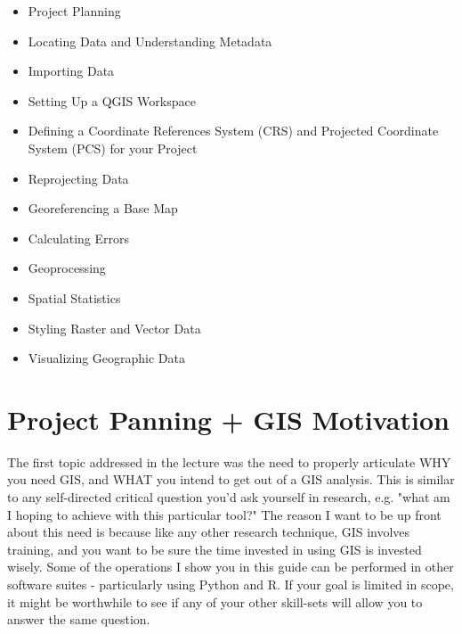 \documentclass{article}
\begin{document}
\begin{itemize}
  \item Project Planning
  \item Locating Data and Understanding Metadata
  \item Importing Data
  \item Setting Up a QGIS Workspace
  \item Defining a Coordinate References System (CRS) and Projected Coordinate System (PCS) for your Project
  \item Reprojecting Data
  \item Georeferencing a Base Map
  \item Calculating Errors
  \item Geoprocessing
  \item Spatial Statistics
  \item Styling Raster and Vector Data
  \item Visualizing Geographic Data
\end{itemize}

\section{Project Panning + GIS Motivation}

The first topic addressed in the lecture was the need to properly articulate WHY you need GIS, and WHAT you intend to get out of a GIS analysis. This is similar to any self-directed critical question you'd ask yourself in research, e.g. "what am I hoping to achieve with this particular tool?" The reason I want to be up front about this need is because like any other research technique, GIS involves training, and you want to be sure the time invested in using GIS is invested wisely. Some of the operations I show you in this guide can be performed in other software suites - particularly using Python and R. If your goal is limited in scope, it might be worthwhile to see if any of your other skill-sets will allow you to answer the same question. 
\end{document}
